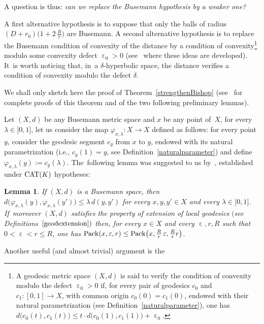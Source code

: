\documentclass[pdftex]{sigma}
\numberwithin{equation}{section}
\newtheorem{Lemma}[theor]{Lemma}
\newcommand{\f}{\rightarrow}
\newcommand{\e}{\operatorname{\varepsilon}}
\begin{document}
\medskip

A question is thus: \textit{can we replace the Busemann hypothesis by a weaker one?}

\medskip

A first alternative hypothesis is to suppose that only the balls of radius $(D+ r_0) \big(1 +2\,\frac{R}{r}\big)$ are Busemann.
A second alternative hypothesis is to replace the Busemann condition of convexity of the distance by a condition of convexity\footnote{A geodesic metric space $(X, d)$ is said to verify the condition of convexity modulo
the defect $\e_0 > 0$ if,
for every pair of geodesics $c_0$ and $c_1\colon [0, 1] \f X $, with common origin $c_0 (0) = c_1 (0)$, endowed with their natural parametrization (see Definition~\ref{naturalparameter}),
one has $ d \big(c_0(t), c_1 (t) \big) \le t\cdot d \big(c_0 (1), c_1 (1) \big) + \e_0$.} modulo some convexity defect $\e_0 > 0$ (see~\cite{BCGS2} where these ideas are developed). It~is worth noticing that, in~a $\delta$-hyperbolic space, the distance verifies a condition of convexity modulo the defect $\delta$.


We shall only sketch here the proof of Theorem~\ref{strengthenBishop} (see~\cite{BCGS2} for complete proofs of this theorem and of the two following
preliminary lemmas).

Let $(X, d) $ be any Busemann metric space and $x$ be any point of~$X$, for every $\lambda \in{} ] 0, 1]$, let us consider the map
$\varphi_{x, \lambda}\colon X \f X$ defined as follows: for every point $y $,
consider the geodesic segment $c_y$ from $x$ to $y$, endowed with its natural parametrization (i.e., $c_y (1) = y$, see Defi\-nition~\ref{naturalparameter}) and define $\varphi_{x, \lambda} (y) := c_y \left( \lambda\right)$. The~following lemma was suggested to us by~\cite[Lemma~4.5]{CS4}, established under ${\rm CAT}(K)$ hypotheses:

\begin{Lemma}\label{contractionbis} If $(X, d) $ is a Busemann space, then $d\big( \varphi_{x, \lambda} (y), \varphi_{x, \lambda} (y')\big) \le
\lambda \, d (y,y')$ for every $x, y, y' \in X$ and every
$\lambda \in{} ] 0, 1]$. If~moreover $(X, d) $ satisfies the property of extension of local geodesics $($see Definitions~$\ref{geodextension})$ then, for every $x \in X$ and every
$ \e, r, R$ such that $ 0 < \e < r \le R$, one has $ {\rm Pack} (x, \e, r) \le {\rm Pack} \big(x, \frac{R}{r} \e,\frac{R}{r} r\big)$.
\end{Lemma}

Another useful (and almost trivial) argument is the
\end{document}
